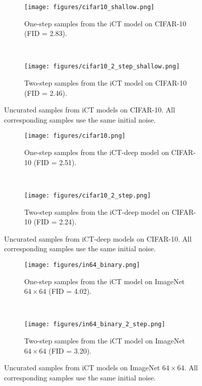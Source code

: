 \newpage
\begin{figure}
    \centering
    \begin{subfigure}[b]{\textwidth}
        \texttt{[image: figures/cifar10\_shallow.png]}
        \caption{One-step samples from the iCT model on CIFAR-10 (FID = 2.83).}
    \end{subfigure}\\
    \vspace{2em}
    \begin{subfigure}[b]{\textwidth}
        \texttt{[image: figures/cifar10\_2\_step\_shallow.png]}
        \caption{Two-step samples from the iCT model on CIFAR-10 (FID = 2.46).}
    \end{subfigure}
    \caption{Uncurated samples from iCT models on CIFAR-10. All corresponding samples use the same initial noise.}
    \label{fig:cifar10_ict}
\end{figure}
\newpage
\begin{figure}
    \centering
    \begin{subfigure}[b]{\textwidth}
        \texttt{[image: figures/cifar10.png]}
        \caption{One-step samples from the iCT-deep model on CIFAR-10 (FID = 2.51).}
    \end{subfigure}\\
    \vspace{2em}
    \begin{subfigure}[b]{\textwidth}
        \texttt{[image: figures/cifar10\_2\_step.png]}
        \caption{Two-step samples from the iCT-deep model on CIFAR-10 (FID = 2.24).}
    \end{subfigure}
    \caption{Uncurated samples from iCT-deep models on CIFAR-10. All corresponding samples use the same initial noise.}
    \label{fig:cifar10_ict_deep}
\end{figure}
\newpage
\begin{figure}
    \centering
    \begin{subfigure}[b]{\textwidth}
        \texttt{[image: figures/in64\_binary.png]}
        \caption{One-step samples from the iCT model on ImageNet $64\times 64$ (FID = 4.02).}
    \end{subfigure}\\
    \begin{subfigure}[b]{\textwidth}
        \texttt{[image: figures/in64\_binary\_2\_step.png]}
        \caption{Two-step samples from the iCT model on ImageNet $64\times 64$ (FID = 3.20).}
    \end{subfigure}
    \caption{Uncurated samples from iCT models on ImageNet $64\times 64$. All corresponding samples use the same initial noise.}
    \label{fig:imagenet_ict}
\end{figure}

